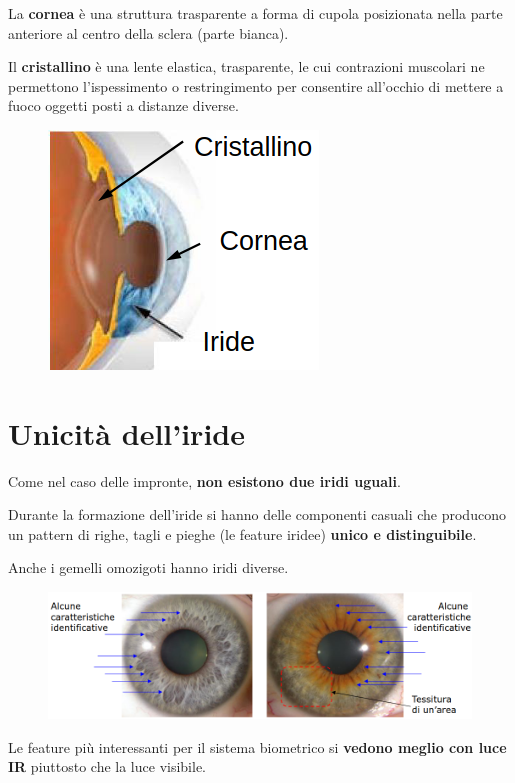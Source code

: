 La \textbf{cornea} è una struttura trasparente a forma di cupola 
posizionata nella parte anteriore al centro della sclera (parte bianca).

Il \textbf{cristallino} è una lente elastica, trasparente, le cui contrazioni muscolari ne 
permettono l'ispessimento o restringimento per consentire all'occhio di mettere a fuoco oggetti 
posti a distanze diverse.

\begin{figure}[ht]
    \centering
    \includegraphics[width=0.4\linewidth]{chapters/images-chap7/struttura-iride.png}
\end{figure}

\section{Unicità dell'iride}

Come nel caso delle impronte, \textbf{non esistono due iridi uguali}.

\noindent Durante la formazione dell'iride si hanno delle componenti casuali che 
producono un pattern di righe, tagli e pieghe (le feature iridee) \textbf{unico
e distinguibile}.

\noindent Anche i gemelli omozigoti hanno iridi diverse.

\begin{figure}[ht]
    \centering
    \includegraphics[width=1\linewidth]{chapters/images-chap7/unicita.png}
\end{figure}

\noindent Le feature più interessanti per il sistema biometrico si \textbf{vedono meglio con luce IR} 
piuttosto che la luce visibile.

